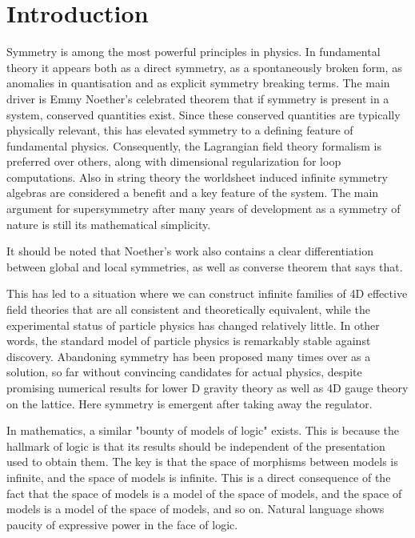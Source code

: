 \section{Introduction}
\label{sec:introduction}

Symmetry is among the most powerful principles in physics. In fundamental theory it appears both as a direct symmetry, as a spontaneously broken form, as anomalies in quantisation and as explicit symmetry breaking terms. The main driver is Emmy Noether's celebrated theorem \cite{noether1918} that if symmetry is present in a system, conserved quantities exist. Since these conserved quantities are typically physically relevant, this has elevated symmetry to a defining feature of fundamental physics. Consequently, the Lagrangian field theory formalism is preferred over others, along with dimensional regularization for loop computations. Also in string theory the worldsheet induced infinite symmetry algebras are considered a benefit and a key feature of the system. The main argument for supersymmetry after many years of development as a symmetry of nature is still its mathematical simplicity.

It should be noted that Noether's work \cite{noether1918} also contains a clear differentiation between global and local symmetries, as well as converse theorem that says that. 

This has led to a situation where we can construct infinite families of 4D effective field theories that are all consistent and theoretically equivalent, while the experimental status of particle physics has changed relatively little. In other words, the standard model of particle physics is remarkably stable against discovery. Abandoning symmetry has been proposed many times over as a solution, so far without convincing candidates for actual physics, despite promising numerical results for lower D gravity theory as well as 4D gauge theory on the lattice. Here symmetry is emergent after taking away the regulator. 

In mathematics, a similar "bounty of models of logic" exists. This is because the hallmark of logic is that its results should be independent of the presentation used to obtain them. The key is that the space of morphisms between models is infinite, and the space of models is infinite. This is a direct consequence of the fact that the space of models is a model of the space of models, and the space of models is a model of the space of models, and so on. Natural language shows paucity of expressive power in the face of logic. 

